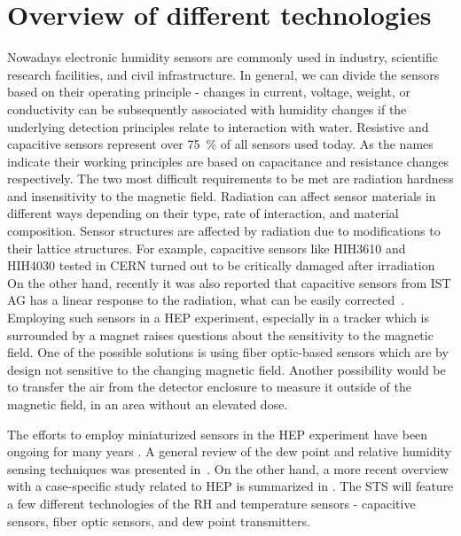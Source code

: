 \section{Overview of different technologies}

Nowadays electronic humidity sensors are commonly used in industry, scientific research facilities, and civil infrastructure. In general, we can divide the sensors based on their operating principle - changes in current, voltage, weight, or conductivity can be subsequently associated with humidity changes if the underlying detection principles relate to interaction with water. Resistive and capacitive sensors represent over 75~\% of all sensors used today. As the names indicate their working principles are based on capacitance and resistance changes respectively. The two most difficult requirements to be met are radiation hardness and insensitivity to the magnetic field. Radiation can affect sensor materials in different ways depending on their type, rate of interaction, and material composition. Sensor structures are affected by radiation due to modifications to their lattice structures. For example, capacitive sensors like HIH3610 and HIH4030 tested in CERN turned out to be critically damaged after irradiation~\cite{Berruti} On the other hand, recently it was also reported that capacitive sensors from IST AG has a linear response to the radiation, what can be easily corrected~\cite{Kapic_sensor}. Employing such sensors in a \gls{HEP} experiment, especially in a tracker which is surrounded by a magnet raises questions about the sensitivity to the magnetic field. One of the possible solutions is using fiber optic-based sensors which are by design not sensitive to the changing magnetic field. Another possibility would be to transfer the air from the detector enclosure to measure it outside of the magnetic field, in an area without an elevated dose. 

The efforts to employ miniaturized sensors in the \gls{HEP} experiment have been ongoing for many years \cite{Berruti}. A general review of the dew point and relative humidity sensing techniques was presented in~\cite{RITTERSMA}. On the other hand, a more recent overview with a case-specific study related to \gls{HEP} is summarized in \cite{Kapic}. The \gls{STS} will feature a few different technologies of the \gls{RH} and temperature sensors - capacitive sensors, fiber optic sensors, and dew point transmitters. 


